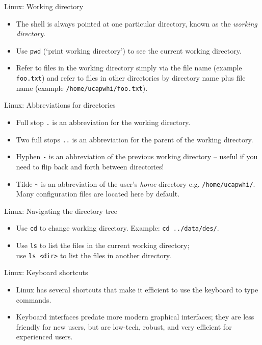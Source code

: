 \documentclass{beamer}
\newcommand{\command}[1]{\colorbox{light-gray}{\texttt{#1}}}
\newcommand{\filename}[1]{\colorbox{light-green}{\texttt{#1}}}
\begin{document}
\begin{frame}{Linux: Working directory}
  \begin{itemize}
    \item{The shell is always pointed at one particular directory, known as the \textit{working directory}.}
    \item{Use \command{pwd} (`print working directory') to see the current working directory.}
    \item{Refer to files in the working directory simply via the file name (example \filename{foo.txt}) and refer to files in other directories by directory name plus file name (example \filename{/home/ucapwhi/foo.txt}).}
  \end{itemize}
\end{frame}


\begin{frame}{Linux: Abbreviations for directories}
  \begin{itemize}
    \item{Full stop \filename{.} is an abbreviation for the working directory.}
    \item{Two full stops \filename{..} is an abbreviation for the parent of the working directory.}
    \item{Hyphen \filename{-} is an abbreviation of the previous working directory -- useful if you need to flip back and forth between directories!}
    \item{Tilde \filename{\textasciitilde} is an abbreviation of the user's \textit{home} directory e.g. \filename{/home/ucapwhi/}. Many configuration files are located here by default.}
  \end{itemize}
\end{frame}


\begin{frame}{Linux: Navigating the directory tree}
  \begin{itemize}
    \item{Use \command{cd} to change working directory. Example: \command{cd ../data/des/}.}
    \item{Use \command{ls} to list the files in the current working directory; \\use \command{ls <dir>} to list the files in another directory.}
  \end{itemize}
\end{frame}


\begin{frame}{Linux: Keyboard shortcuts}
  \begin{itemize}
    \item{Linux has several shortcuts that make it efficient to use the keyboard to type commands.}
    \item{Keyboard interfaces predate more modern graphical interfaces; they are less friendly for new users, but are low-tech, robust, and very efficient for experienced users.}
  \end{itemize}
\end{frame}
\end{document}
